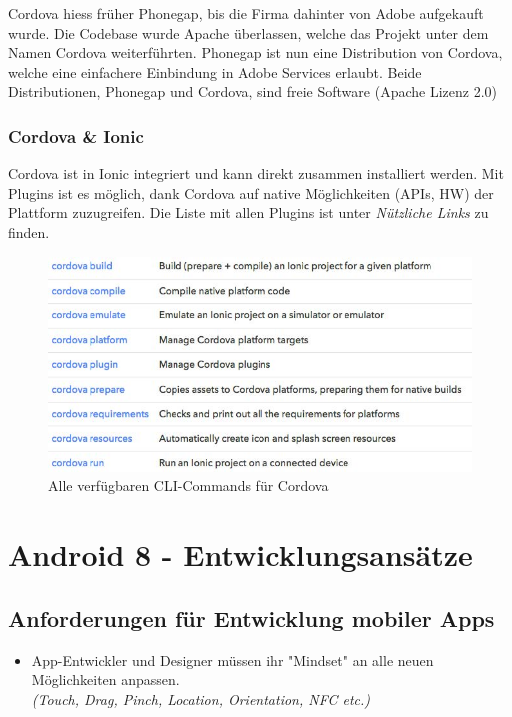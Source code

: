 \documentclass[a4paper]{article}
\begin{document}
{	Cordova hiess früher Phonegap, bis die Firma dahinter von Adobe aufgekauft wurde. 
	Die Codebase wurde Apache überlassen, welche das Projekt unter dem Namen Cordova weiterführten.
	Phonegap ist nun eine Distribution von Cordova, welche eine einfachere Einbindung in Adobe Services erlaubt.
	Beide Distributionen, Phonegap und Cordova, sind freie Software (Apache Lizenz 2.0)
	
	\subsubsection{Cordova \& Ionic}
	
	Cordova ist in Ionic integriert und kann direkt zusammen installiert werden.
	Mit Plugins ist es möglich, dank Cordova auf native Möglichkeiten (APIs, HW) der Plattform zuzugreifen. 
	Die Liste mit allen Plugins ist unter \textit{Nützliche Links} zu finden.
	
	\begin{figure}[!htb]
		\centering
		\includegraphics[width=.7\textwidth]{img/android7/cordova_commands.jpg}
		\caption{Alle verfügbaren CLI-Commands für Cordova}
		\label{fig:cordova_commands}
	\end{figure}
		
\newpage
\section{Android 8 - Entwicklungsansätze}

	\subsection{Anforderungen für Entwicklung mobiler Apps}
	
	\begin{itemize}
		
		\item App-Entwickler und Designer müssen ihr "Mindset" an alle neuen Möglichkeiten anpassen.\\
		\textit{(Touch, Drag, Pinch, Location, Orientation, NFC etc.)}
		

\end{itemize}}
\end{document}
